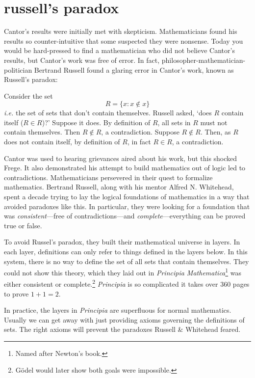 \documentclass{scrbook}
\newcommand{\ie}{\emph{i.e.}\xspace}
\begin{document}
\section[Russell's paradox]{russell's paradox}
Cantor's results were initially met with skepticism. Mathematicians found his results so counter-intuitive that some suspected they were nonsense. Today you would be hard-pressed to find a mathematician who did not believe Cantor's results, but Cantor's work was free of error. In fact, philosopher-mathematician-politician Bertrand Russell found a glaring error in Cantor's work, known as Russell's paradox: 

Consider the set
\[
R= \{x: x\notin x\}
\]
\ie the set of sets that don't contain themselves. Russell asked, `does $R$ contain itself ($R\in R$)?' Suppose it does. By definition of $R$, all sets in $R$ must not contain themselves. Then $R\notin R$, a contradiction. Suppose $R\notin R$. Then, as $R$ does not contain itself, by definition of $R$, in fact $R\in R$, a contradiction. 

Cantor was used to hearing grievances aired about his work, but this shocked Frege. It also demonstrated his attempt to build mathematics out of logic led to contradictions. Mathematicians persevered in their quest to formalize mathematics. Bertrand Russell, along with his mentor Alfred N. Whitehead, spent a decade trying to lay the logical foundations of mathematics in a way that avoided paradoxes like this. In particular, they were looking for a foundation that was \emph{consistent}---free of contradictions---and \emph{complete}---everything can be proved true or false. 

To avoid Russel's paradox, they built their mathematical universe in layers. In each layer, definitions can only refer to things defined in the layers below. In this system, there is no way to define the set of all sets that contain themselves. They could not show this theory, which they laid out in \emph{Principia Mathematica}\footnote{Named after Newton's book.} was either consistent or complete.\footnote{Gödel would later show both goals were impossible.} \emph{Principia} is so complicated it takes over 360 pages to prove $1+1=2$\cite{principia}. 

In practice, the layers in \emph{Principia} are superfluous for normal mathematics. Usually we can get away with just providing axioms governing the definitions of sets. The right axioms will prevent the paradoxes Russell \& Whitehead feared. 
\end{document}
